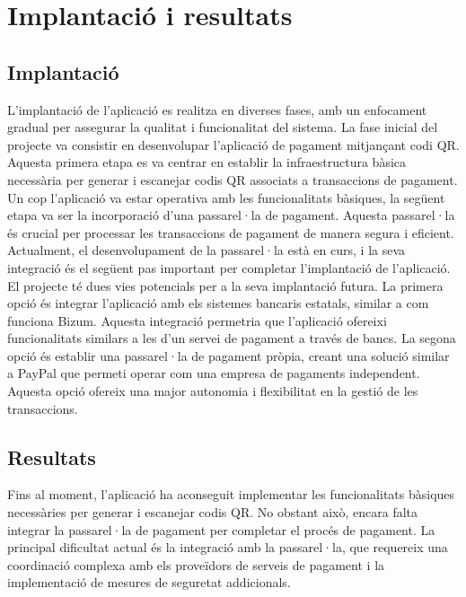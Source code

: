 \documentclass[a4paper,12pt,twoside]{ThesisStyle}
\begin{document}
\chapter{Implantació i resultats}
\label{chp:implantacio}


\section{Implantació}
\label{sec: Implantació}

L'implantació de l'aplicació es realitza en diverses fases, amb un enfocament gradual per assegurar la qualitat i funcionalitat del sistema. La fase inicial del projecte va consistir en desenvolupar l'aplicació de pagament mitjançant codi QR. Aquesta primera etapa es va centrar en establir la infraestructura bàsica necessària per generar i escanejar codis QR associats a transaccions de pagament.\\

Un cop l'aplicació va estar operativa amb les funcionalitats bàsiques, la següent etapa va ser la incorporació d'una passarel·la de pagament. Aquesta passarel·la és crucial per processar les transaccions de pagament de manera segura i eficient. Actualment, el desenvolupament de la passarel·la està en curs, i la seva integració és el següent pas important per completar l'implantació de l'aplicació.\\

El projecte té dues vies potencials per a la seva implantació futura. La primera opció és integrar l'aplicació amb els sistemes bancaris estatals, similar a com funciona Bizum. Aquesta integració permetria que l'aplicació ofereixi funcionalitats similars a les d'un servei de pagament a través de bancs. La segona opció és establir una passarel·la de pagament pròpia, creant una solució similar a PayPal que permeti operar com una empresa de pagaments independent. Aquesta opció ofereix una major autonomia i flexibilitat en la gestió de les transaccions.


\section{Resultats}
\label{sec: Resultats}

Fins al moment, l'aplicació ha aconseguit implementar les funcionalitats bàsiques necessàries per generar i escanejar codis QR. No obstant això, encara falta integrar la passarel·la de pagament per completar el procés de pagament. La principal dificultat actual és la integració amb la passarel·la, que requereix una coordinació complexa amb els proveïdors de serveis de pagament i la implementació de mesures de seguretat addicionals.\\
\end{document}
